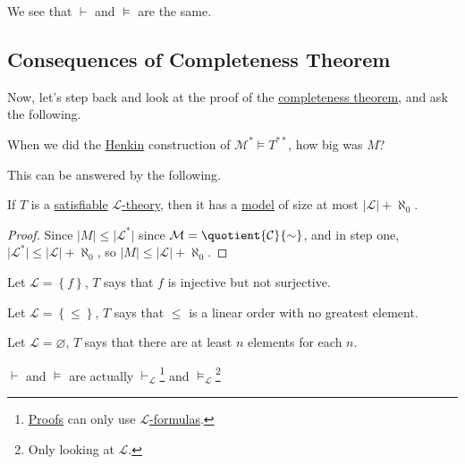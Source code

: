 \begin{remark}
	We see that \(\vdash \) and \(\models \) are the same.
\end{remark}

\subsection{Consequences of Completeness Theorem}
Now, let's step back and look at the proof of the \hyperref[thm:completeness]{completeness theorem}, and ask the following.

\begin{problem*}
	When we did the \hyperref[def:Henkin-constant]{Henkin} construction of \(\mathcal{M} ^{\ast} \models T^{\ast\ast }\), how big was \(M\)?
\end{problem*}

This can be answered by the following.

\begin{theorem}
	If \(T\) is a \hyperref[def:satisfiable]{satisfiable} \hyperref[def:theory]{\(\mathcal{L}\)-theory}, then it has a \hyperref[def:model]{model} of size at most \(\vert \mathcal{L} \vert + \aleph_0\).
\end{theorem}
\begin{proof}
	Since \(\vert M \vert \leq \vert \mathcal{L} ^{\ast} \vert \) since \(\mathcal{M} = \quotient{\mathcal{C} }{\sim } \), and in step one, \(\vert \mathcal{L} ^{\ast} \vert \leq \vert \mathcal{L}  \vert + \aleph_0\), so \(\vert M \vert \leq \vert \mathcal{L}  \vert + \aleph_0\).
\end{proof}

\begin{eg}
	Let \(\mathcal{L} =\left\{ f \right\} \), \(T\) says that \(f\) is injective but not surjective.
\end{eg}

\begin{eg}
	Let \(\mathcal{L} = \left\{ \leq \right\} \), \(T\) says that \(\leq \) is a linear order with no greatest element.
\end{eg}

\begin{eg}
	Let \(\mathcal{L} = \varnothing \), \(T\) says that there are at least \(n\) elements for each \(n\).
\end{eg}

\begin{prev}
	\(\vdash \) and \(\models \) are actually \(\vdash _{\mathcal{L} }\)\footnote{\hyperref[def:proof]{Proofs} can only use \hyperref[def:formula]{\(\mathcal{L}\)-formulas}.} and \(\models _\mathcal{L} \)\footnote{Only looking at \(\mathcal{L} \).}
\end{prev}

